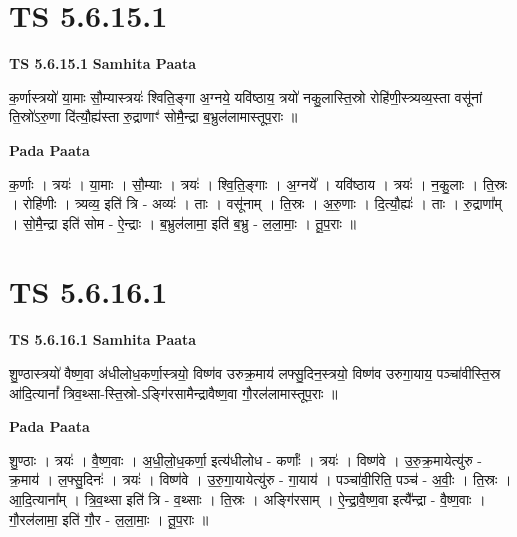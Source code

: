 \documentclass[17pt]{extarticle}
\begin{document}
\section*{ TS 5.6.15.1 }

\textbf{TS 5.6.15.1 } \newline
\textbf{Samhita Paata} \newline

क॒र्णास्त्रयो॑ या॒माः सौ॒म्यास्त्रयः॑ श्विति॒ङ्गा अ॒ग्नये॒ यवि॑ष्ठाय॒ त्रयो॑ नकु॒लास्ति॒स्रो रोहि॑णी॒स्त्र्यव्य॒स्ता वसू॑नां ति॒स्रो॑ऽरु॒णा दि॑त्यौ॒ह्य॑स्ता रु॒द्राणाꣳ॑ सोमै॒न्द्रा ब॒भ्रुल॑लामास्तूप॒राः ॥ \newline

\textbf{Pada Paata} \newline

क॒र्णाः । त्रयः॑ । या॒माः । सौ॒म्याः । त्रयः॑ । श्वि॒ति॒ङ्गाः । अ॒ग्नये᳚ । यवि॑ष्ठाय । त्रयः॑ । न॒कु॒लाः । ति॒स्रः । रोहि॑णीः । त्र्यव्य॒ इति॑ त्रि - अव्यः॑ । ताः । वसू॑नाम् । ति॒स्रः । अ॒रु॒णाः । दि॒त्यौ॒ह्यः॑ । ताः । रु॒द्राणा᳚म् । सो॒मै॒न्द्रा इति॑ सोम - ऐ॒न्द्राः । ब॒भ्रुल॑लामा॒ इति॑ ब॒भ्रु - ल॒ला॒माः॒ । तू॒प॒राः ॥  \newline




\section*{ TS 5.6.16.1 }

\textbf{TS 5.6.16.1 } \newline
\textbf{Samhita Paata} \newline

शु॒ण्ठास्त्रयो॑ वैष्ण॒वा अ॑धीलोध॒कर्णा॒स्त्रयो॒ विष्ण॑व उरुक्र॒माय॑ लफ्सु॒दिन॒स्त्रयो॒ विष्ण॑व उरुगा॒याय॒ पञ्चा॑वीस्ति॒स्र आ॑दि॒त्यानां᳚ त्रिव॒थ्सा-स्ति॒स्रो-ऽङ्गि॑रसामैन्द्रावैष्ण॒वा गौ॒रल॑लामास्तूप॒राः ॥ \newline

\textbf{Pada Paata} \newline

शु॒ण्ठाः । त्रयः॑ । वै॒ष्ण॒वाः । अ॒धी॒लो॒ध॒कर्णा॒ इत्य॑धीलोध - कर्णाः᳚ । त्रयः॑ । विष्ण॑वे । उ॒रु॒क्र॒मायेत्यु॑रु - क्र॒माय॑ । ल॒फ्सु॒दिनः॑ । त्रयः॑ । विष्ण॑वे । उ॒रु॒गा॒यायेत्यु॑रु - गा॒याय॑ । पञ्चा॑वी॒रिति॒ पञ्च॑ - अ॒वीः॒ । ति॒स्रः । आ॒दि॒त्याना᳚म् । त्रि॒व॒थ्सा इति॑ त्रि - व॒थ्साः । ति॒स्रः । अङ्गि॑रसाम् । ऐ॒न्द्रा॒वै॒ष्ण॒वा इत्यै᳚न्द्रा - वै॒ष्ण॒वाः । गौ॒रल॑लामा॒ इति॑ गौ॒र - ल॒ला॒माः॒ । तू॒प॒राः ॥  \newline
\end{document}
